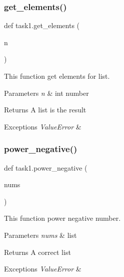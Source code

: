 \subsubsection{\texorpdfstring{get\+\_\+elements()}{get\_elements()}}
{\footnotesize\ttfamily def task1.\+get\+\_\+elements (\begin{DoxyParamCaption}\item[{}]{n }\end{DoxyParamCaption})}



This function get elements for list. 


\begin{DoxyParams}{Parameters}
{\em n} & int number \\
\hline
\end{DoxyParams}
\begin{DoxyReturn}{Returns}
A list is the result
\end{DoxyReturn}

\begin{DoxyExceptions}{Exceptions}
{\em Value\+Error} & \\
\hline
\end{DoxyExceptions}
\mbox{\label{namespacetask1_a16c470ef91d697c6523dc85de707f47d}} 
\subsubsection{\texorpdfstring{power\+\_\+negative()}{power\_negative()}}
{\footnotesize\ttfamily def task1.\+power\+\_\+negative (\begin{DoxyParamCaption}\item[{}]{nums }\end{DoxyParamCaption})}



This function power negative number. 


\begin{DoxyParams}{Parameters}
{\em nums} & list \\
\hline
\end{DoxyParams}
\begin{DoxyReturn}{Returns}
A correct list
\end{DoxyReturn}

\begin{DoxyExceptions}{Exceptions}
{\em Value\+Error} & \\
\hline
\end{DoxyExceptions}


